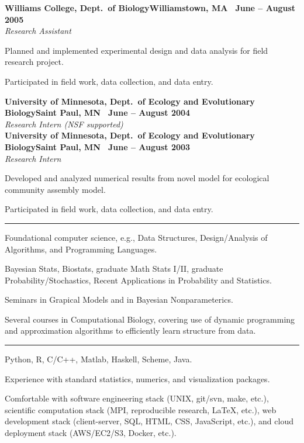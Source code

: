 \documentclass{article}
\newcommand{\ressection}[1]{\noindent{\large\textbf{#1}}\vspace{2pt}\hrule\vspace{4pt}}
\newcommand{\leftandright}[2]{\noindent\textbf{#1}\hfill\textbf{#2}}
\begin{document}
\leftandright{Williams College, Dept.\ of Biology}{Williamstown, MA
  \textbullet\, June -- August 2005} \\
\textit{Research Assistant}

\begin{itemize*}
\item Planned and implemented experimental design and data analysis
  for field research project.
\item Participated in field work, data collection, and data entry.
\end{itemize*}

\leftandright{University of Minnesota, Dept.\ of Ecology and
  Evolutionary Biology}{Saint Paul, MN \textbullet\, June -- August
  2004} \\
\textit{Research Intern (NSF supported)} \\
\leftandright{University of Minnesota, Dept.\ of Ecology and
  Evolutionary Biology}{Saint Paul, MN \textbullet\, June -- August
  2003} \\
\textit{Research Intern}

\begin{itemize*}
\item Developed and analyzed numerical results from novel model for ecological
  community assembly model.
\item Participated in field work, data collection, and data entry.
\end{itemize*}

\vspace{1.0em}

\ressection{Relevant coursework}

\begin{itemize*}
\item Foundational computer science, e.g., Data Structures,
  Design/Analysis of Algorithms, and Programming Languages.
\item Bayesian Stats, Biostats, graduate Math Stats I/II, graduate
  Probability/Stochastics, Recent Applications in Probability and Statistics.
\item Seminars in Grapical Models and in Bayesian Nonparameterics.
\item Several courses in Computational Biology, covering use of
  dynamic programming and approximation algorithms to efficiently
  learn structure from data.
\end{itemize*}

\vspace{1.0em}

\ressection{Programming}

\begin{itemize*}
\item Python, R, C/C++, Matlab, Haskell, Scheme, Java.
\item Experience with standard statistics, numerics, and
  visualization packages.
\item Comfortable with software engineering stack (UNIX, git/svn,
  make, etc.), scientific computation stack (MPI, reproducible
  research, \LaTeX, etc.), web development stack (client-server,
  SQL, HTML, CSS, JavaScript, etc.), and cloud deployment stack
  (AWS/EC2/S3, Docker, etc.).
\end{itemize*}
\end{document}

